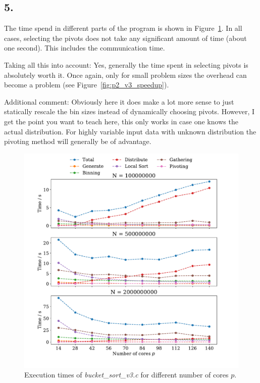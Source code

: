 \documentclass[a4paper, 11pt]{article}
\begin{document}
\subsection*{5.}
The time spend in different parts of the program is shown in
Figure~\ref{fig:p2_v3_times}. In all cases, selecting the pivots does not take
any significant amount of time (about one second). This includes the
communication time.

Taking all this into account: Yes, generally the time spent in selecting pivots
is absolutely worth it. Once again, only for small problem sizes the overhead
can become a problem (see Figure~\ref{fig:p2_v3_speedup}).

Additional comment: Obviously here it does make a lot more sense to just
statically rescale the bin sizes instead of dynamically choosing pivots.
However, I get the point you want to teach here, this only works in case one
knows the actual distribution. For highly variable input data with unknown
distribution the pivoting method will generally be of advantage.

\begin{figure}
  \centering
  \includegraphics[width=\textwidth]{../part_2/plot/v3_times.pdf}
  \caption{Execution times  of \textit{bucket\_sort\_v3.c} for different number
  of cores $p$.}
  \label{fig:p2_v3_times}
\end{figure}
\end{document}
